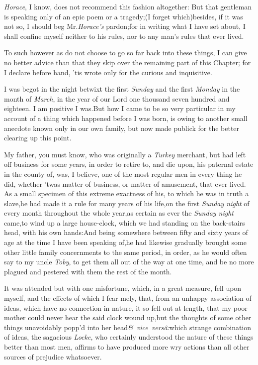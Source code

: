 \documentclass{article}
\begin{document}
\textit{Horace}, I know, does not recommend this fashion
altogether: But that gentleman is speaking only of an epic poem or
a tragedy;\tsk  (I forget which)\tsk besides, if it was not so, I
should beg Mr.\@ \textit{Horace’s} pardon;\tsk  for in writing
what I have set about, I shall confine myself neither to his rules,
nor to any man’s rules that ever lived.

To such however as do not choose to 
go so far back into these things, I can\break
give no better advice than that they\break
skip over the remaining part of this\break 
Chapter; for I declare before hand, ’tis\pb
wrote only for the curious and inquisitive.

\noindent
{}\break
I was begot in the night betwixt the first \textit{Sunday} and the first
\textit{Monday} in the month of \textit{March}, in the year of our Lord one thousand
seven hundred and eighteen.\break
I am positive I was.\tsk  But how I came to be so very
particular in my account of a thing which happened before I was born, is owing to
another small anecdote known only in our own family, but now made publick for the
better clearing up this point.

My father, you must know, who was originally a \textit{Turkey}
merchant, but had left off business for some years, in order to
retire to, and die upon, his paternal estate in the county of\tsh, was, I believe, 
\pb one of the most regular men in
every thing he did, whether ’twas matter of business, or
matter of amusement, that ever lived. As a small specimen of this
extreme exactness of his, to which he was in truth a slave,\tsk he had
made it a rule for many years of his life,\tsk  on the first
\textit{Sunday night} of every month throughout the whole
year,\tsk  as certain as ever the \textit{Sunday night}
came,\tsk  to wind up a large house-clock, which we had standing
on the back-stairs head, with his own hands:\tsk  And being
somewhere between fifty and sixty years of age at the time I
have been speaking of,\tsk  he had likewise gradually
brought some other little family concernments to the same period,
in order, as he would often say to my uncle \textit{Toby}, to get
them all out of the way at one time, and be no more plagued\pb
and pestered with them the rest of the month.

It was attended but with one misfortune, which, in a great
measure, fell upon myself, and the effects of which I fear\break
{}
mely, that, from an unhappy association
of ideas, which have no connection in nature, it so fell out at
length, that my poor mother could never hear the said clock wound
up,\tsk  but the thoughts of some other things unavoidably
popp’d into her head\tsk  \hbox{{\small\itshape\egb\&} \textit{vice
versâ:}}\tsk  which strange combination of ideas, the
sagacious \textit{Locke}, who certainly understood the nature of
these things better than most men, affirms to have produced more
wry actions than all other sources of prejudice whatsoever.
\end{document}
